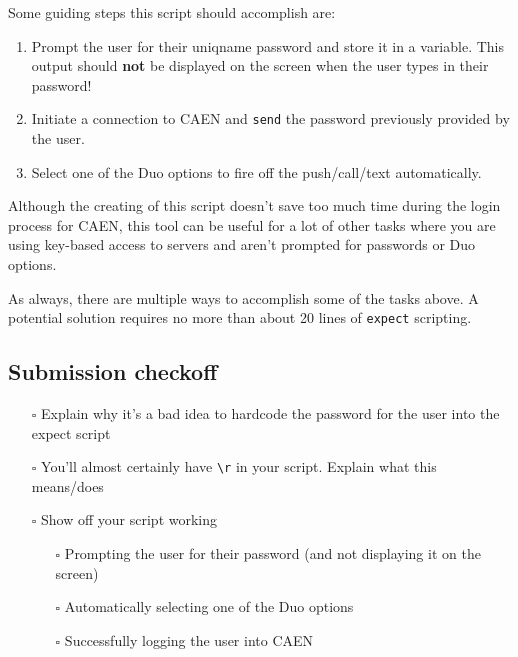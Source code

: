 \documentclass{article}
\begin{document}
Some guiding steps this script should accomplish are:

\begin{enumerate}
    \item
        Prompt the user for their uniqname password and store
        it in a variable. This output should \textbf{not} be displayed on the screen when
        the user types in their password!
    \item
        Initiate a connection to CAEN and \texttt{send} the password previously
        provided by the user.
    \item
        Select one of the Duo options to fire off the push/call/text
        automatically.
\end{enumerate}

Although the creating of this script doesn't save too much time during the login
process for CAEN, this tool can be useful for a lot of other
tasks where you are using key-based access to servers and aren't prompted for
passwords or Duo options.

As always, there are multiple ways to accomplish some of the tasks above. A
potential solution requires no more than about 20 lines of \texttt{expect}
scripting.

\subsection*{Submission checkoff}
\begin{itemize}
  \item[$\square$] Explain why it's a bad idea to hardcode the password for the
      user into the expect script
  \item[$\square$] You'll almost certainly have \texttt{\textbackslash r} in your script. Explain
      what this means/does
  \item[$\square$] Show off your script working
    \begin{itemize}
        \item[$\square$] Prompting the user for their password (and not
            displaying it on the screen)
      \item[$\square$] Automatically selecting one of the Duo options
      \item[$\square$] Successfully logging the user into CAEN
    \end{itemize}
\end{itemize}
\end{document}
